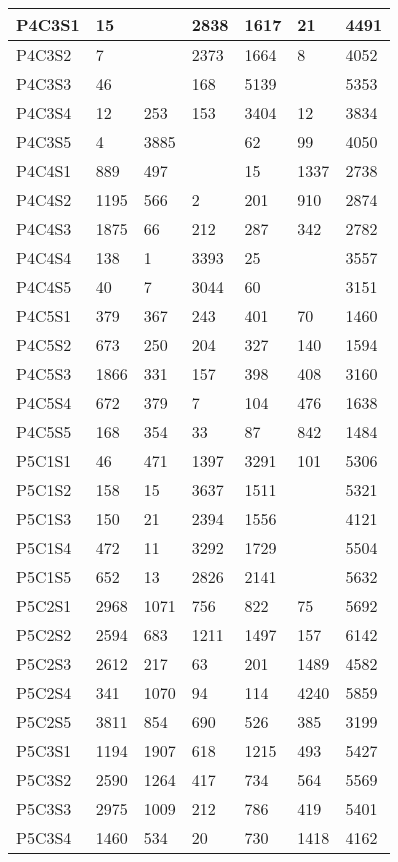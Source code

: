 \begin{longtable}{|l|l|l|l|l|l|l|}
P4C3S1 & 15 &  & 2838 & 1617 & 21 & 4491 \\ \hline
P4C3S2 & 7 &  & 2373 & 1664 & 8 & 4052 \\ \hline
P4C3S3 & 46 &  & 168 & 5139 &  & 5353 \\ \hline
P4C3S4 & 12 & 253 & 153 & 3404 & 12 & 3834 \\ \hline
P4C3S5 & 4 & 3885 &  & 62 & 99 & 4050 \\ \hline
P4C4S1 & 889 & 497 &  & 15 & 1337 & 2738 \\ \hline
P4C4S2 & 1195 & 566 & 2 & 201 & 910 & 2874 \\ \hline
P4C4S3 & 1875 & 66 & 212 & 287 & 342 & 2782 \\ \hline
P4C4S4 & 138 & 1 & 3393 & 25 &  & 3557 \\ \hline
P4C4S5 & 40 & 7 & 3044 & 60 &  & 3151 \\ \hline
P4C5S1 & 379 & 367 & 243 & 401 & 70 & 1460 \\ \hline
P4C5S2 & 673 & 250 & 204 & 327 & 140 & 1594 \\ \hline
P4C5S3 & 1866 & 331 & 157 & 398 & 408 & 3160 \\ \hline
P4C5S4 & 672 & 379 & 7 & 104 & 476 & 1638 \\ \hline
P4C5S5 & 168 & 354 & 33 & 87 & 842 & 1484 \\ \hline
P5C1S1 & 46 & 471 & 1397 & 3291 & 101 & 5306 \\ \hline
P5C1S2 & 158 & 15 & 3637 & 1511 &  & 5321 \\ \hline
P5C1S3 & 150 & 21 & 2394 & 1556 &  & 4121 \\ \hline
P5C1S4 & 472 & 11 & 3292 & 1729 &  & 5504 \\ \hline
P5C1S5 & 652 & 13 & 2826 & 2141 &  & 5632 \\ \hline
P5C2S1 & 2968 & 1071 & 756 & 822 & 75 & 5692 \\ \hline
P5C2S2 & 2594 & 683 & 1211 & 1497 & 157 & 6142 \\ \hline
P5C2S3 & 2612 & 217 & 63 & 201 & 1489 & 4582 \\ \hline
P5C2S4 & 341 & 1070 & 94 & 114 & 4240 & 5859 \\ \hline
P5C2S5 & 3811 & 854 & 690 & 526 & 385 & 3199 \\ \hline
P5C3S1 & 1194 & 1907 & 618 & 1215 & 493 & 5427 \\ \hline
P5C3S2 & 2590 & 1264 & 417 & 734 & 564 & 5569 \\ \hline
P5C3S3 & 2975 & 1009 & 212 & 786 & 419 & 5401 \\ \hline
P5C3S4 & 1460 & 534 & 20 & 730 & 1418 & 4162 \\ \hline

\end{longtable}
